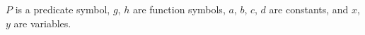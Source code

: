 $P$ is a predicate symbol, $g$, $h$ are function symbols, $a$, $b$, $c$, $d$ are constants, and $x$, $y$ are variables.
